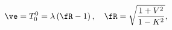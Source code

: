 \begin{equation}\label{epsdef}
    \ve= T ^0_0=\lambda   \left(\fR -1\right),\quad
    \fR=\sqrt{\frac{1+V^2}{1-K^2}},
\end{equation}

